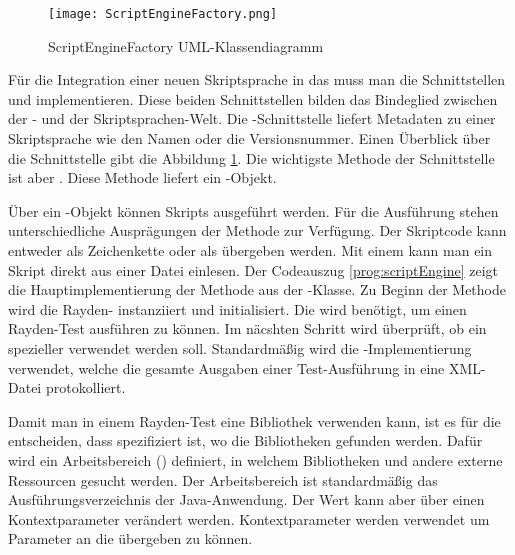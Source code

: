 \begin{figure}
\centering
\texttt{[image: ScriptEngineFactory.png]}
\caption{ScriptEngineFactory UML-Klassendiagramm}
\label{fig:scriptEngineFactoryUml}
\end{figure}

\begin{program}

\caption{Codeauszug aus der }
\label{prog:scriptEngine}
\end{program}

\SuperPar
Für die Integration einer neuen Skriptsprache in das  muss man die Schnittstellen  und  implementieren. Diese beiden Schnittstellen bilden das Bindeglied zwischen der - und der Skriptsprachen-Welt. Die -Schnittstelle liefert Metadaten zu einer Skriptsprache wie den Namen oder die Versionsnummer. Einen Überblick über die Schnittstelle gibt die Abbildung \ref{fig:scriptEngineFactoryUml}. Die wichtigste Methode der Schnittstelle ist aber . Diese Methode liefert ein -Objekt.

\SuperPar
Über ein -Objekt können Skripts ausgeführt werden. Für die Ausführung stehen unterschiedliche Ausprägungen der Methode  zur Verfügung. Der Skriptcode kann entweder als Zeichenkette oder als  übergeben werden. Mit einem  kann man ein Skript direkt aus einer Datei einlesen. Der Codeauszug \ref{prog:scriptEngine} zeigt die Hauptimplementierung der  Methode aus der -Klasse. Zu Beginn der Methode wird die Rayden- instanziiert und initialisiert. Die  wird benötigt, um einen Rayden-Test ausführen zu können. Im näcshten Schritt wird überprüft, ob ein spezieller  verwendet werden soll. Standardmäßig wird die -Implementierung verwendet, welche die gesamte Ausgaben einer Test-Ausführung in eine XML-Datei protokolliert. 

\SuperPar
Damit man in einem Rayden-Test eine Bibliothek verwenden kann, ist es für die  entscheiden, dass spezifiziert ist, wo die Bibliotheken gefunden werden. Dafür wird ein Arbeitsbereich () definiert, in welchem Bibliotheken und andere externe Ressourcen gesucht werden. Der Arbeitsbereich ist standardmäßig das Ausführungsverzeichnis der Java-Anwendung. Der Wert kann aber über einen Kontextparameter verändert werden. Kontextparameter werden verwendet um Parameter an die  übergeben zu können. 

